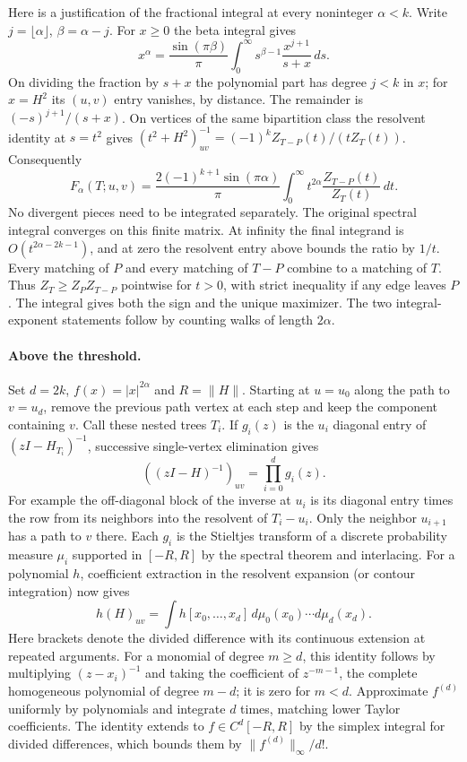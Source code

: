 \documentclass[11pt]{article}
\begin{document}
Here is a justification of the fractional integral at every noninteger $\alpha<k$. Write $j=\lfloor\alpha\rfloor$, $\beta=\alpha-j$. For $x\ge0$ the beta integral gives
\[
 x^\alpha=\frac{\sin(\pi\beta)}\pi\int_0^\infty s^{\beta-1}\frac{x^{j+1}}{s+x}\,ds .
\]
On dividing the fraction by $s+x$ the polynomial part has degree $j<k$ in $x$; for $x=H^2$ its $(u,v)$ entry vanishes, by distance. The remainder is $(-s)^{j+1}/(s+x)$. On vertices of the same bipartition class the resolvent identity at $s=t^2$ gives $(t^2+H^2)^{-1}_{uv}=(-1)^k Z_{T-P}(t)/(t Z_T(t))$. Consequently
\[
 F_\alpha(T;u,v)=\frac{2(-1)^{k+1}\sin(\pi\alpha)}\pi
 \int_0^\infty t^{2\alpha}\frac{Z_{T-P}(t)}{Z_T(t)}\,dt .
\]
No divergent pieces need to be integrated separately. The original spectral integral converges on this finite matrix. At infinity the final integrand is $O(t^{2\alpha-2k-1})$, and at zero the resolvent entry above bounds the ratio by $1/t$.
Every matching of $P$ and every matching of $T-P$ combine to a matching of $T$. Thus $Z_T\ge Z_P Z_{T-P}$ pointwise for $t>0$, with strict inequality if any edge leaves $P$. The integral gives both the sign and the unique maximizer. The two integral-exponent statements follow by counting walks of length $2\alpha$.

\paragraph{Above the threshold.}
Set $d=2k$, $f(x)=|x|^{2\alpha}$ and $R=\|H\|$. Starting at $u=u_0$ along the path to $v=u_d$, remove the previous path vertex at each step and keep the component containing $v$. Call these nested trees $T_i$. If $g_i(z)$ is the $u_i$ diagonal entry of $(zI-H_{T_i})^{-1}$, successive single-vertex elimination gives
\[
 ((zI-H)^{-1})_{uv}=\prod_{i=0}^d g_i(z).
\]
For example the off-diagonal block of the inverse at $u_i$ is its diagonal entry times the row from its neighbors into the resolvent of $T_i-u_i$. Only the neighbor $u_{i+1}$ has a path to $v$ there. Each $g_i$ is the Stieltjes transform of a discrete probability measure $\mu_i$ supported in $[-R,R]$ by the spectral theorem and interlacing. For a polynomial $h$, coefficient extraction in the resolvent expansion (or contour integration) now gives
\[
 h(H)_{uv}=\int h[x_0,\dots,x_d]\,d\mu_0(x_0)\cdots d\mu_d(x_d).
\]
Here brackets denote the divided difference with its continuous extension at repeated arguments. For a monomial of degree $m\ge d$, this identity follows by multiplying $(z-x_i)^{-1}$ and taking the coefficient of $z^{-m-1}$, the complete homogeneous polynomial of degree $m-d$; it is zero for $m<d$. Approximate $f^{(d)}$ uniformly by polynomials and integrate $d$ times, matching lower Taylor coefficients. The identity extends to $f\in C^d[-R,R]$ by the simplex integral for divided differences, which bounds them by $\|f^{(d)}\|_\infty/d!$.
\end{document}

